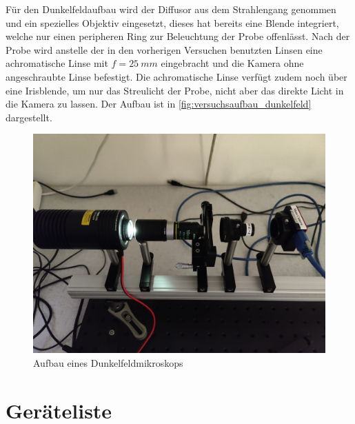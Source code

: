 \documentclass[english, ngerman]{scrartcl}
\begin{document}
Für den Dunkelfeldaufbau wird der Diffusor aus dem Strahlengang genommen und ein spezielles Objektiv eingesetzt, dieses hat bereits eine Blende integriert, welche nur einen peripheren Ring zur Beleuchtung der Probe offenlässt. Nach der Probe wird anstelle der in den vorherigen Versuchen benutzten Linsen eine achromatische Linse mit $f = \SI{25}{mm}$ eingebracht und die Kamera ohne angeschraubte Linse befestigt. Die achromatische Linse verfügt zudem noch über eine Irisblende, um nur das Streulicht der Probe, nicht aber das direkte Licht in die Kamera zu lassen. Der Aufbau ist in \autoref{fig:versuchsaufbau_dunkelfeld} dargestellt.
%
\begin{figure}[H]
    \centering
    \begin{samepage}
        \includegraphics[width=\linewidth]{fig/Dunkelfeld.jpeg}
        \caption{Aufbau eines Dunkelfeldmikroskops}
        \label{fig:versuchsaufbau_dunkelfeld}
    \end{samepage}
\end{figure}



\section{Geräteliste}
\label{sec:geraeteliste}
\end{document}
